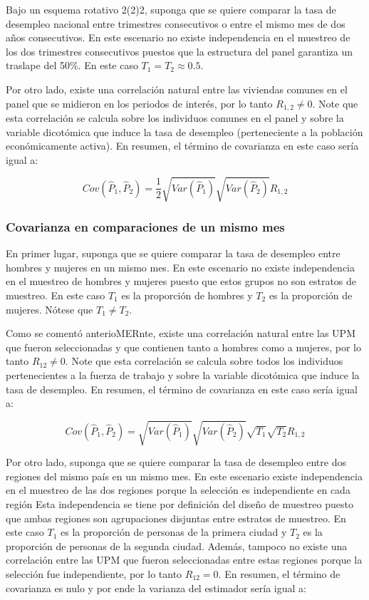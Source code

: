 \documentclass[
  12pt,
  spanish,
]{book}
\begin{document}
Bajo un esquema rotativo 2(2)2, suponga que se quiere comparar la tasa de desempleo nacional entre trimestres consecutivos o entre el mismo mes de dos años consecutivos. En este escenario no existe independencia en el muestreo de los dos trimestres consecutivos puestos que la estructura del panel garantiza un traslape del 50\%. En este caso \(T_1 = T_2 \approx 0.5\).

Por otro lado, existe una correlación natural entre las viviendas comunes en el panel que se midieron en los periodos de interés, por lo tanto \(R_{1,2} \neq 0\). Note que esta correlación se calcula sobre los individuos comunes en el panel y sobre la variable dicotómica que induce la tasa de desempleo (perteneciente a la población económicamente activa). En resumen, el término de covarianza en este caso sería igual a:

\[
Cov(\hat{P}_1, \hat{P}_2) = \frac{1}{2}\sqrt{Var(\hat{P}_1)}\sqrt{Var(\hat{P}_2)}R_{1,2}
\]

\hypertarget{covarianza-en-comparaciones-de-un-mismo-mes}{%
\subsubsection{Covarianza en comparaciones de un mismo mes}\label{covarianza-en-comparaciones-de-un-mismo-mes}}

En primer lugar, suponga que se quiere comparar la tasa de desempleo entre hombres y mujeres en un mismo mes. En este escenario no existe independencia en el muestreo de hombres y mujeres puesto que estos grupos no son estratos de muestreo. En este caso \(T_1\) es la proporción de hombres y \(T_2\) es la proporción de mujeres. Nótese que \(T_1 \neq T_2\).

Como se comentó anterioMERnte, existe una correlación natural entre las UPM que fueron seleccionadas y que contienen tanto a hombres como a mujeres, por lo tanto \(R_{12} \neq 0\). Note que esta correlación se calcula sobre todos los individuos pertenecientes a la fuerza de trabajo y sobre la variable dicotómica que induce la tasa de desempleo. En resumen, el término de covarianza en este caso sería igual a:

\[
Cov(\hat{P}_1, \hat{P}_2) = \sqrt{Var(\hat{P}_1)}\sqrt{Var(\hat{P}_2)}\sqrt{T_1}\sqrt{T_2}R_{1,2}
\]

Por otro lado, suponga que se quiere comparar la tasa de desempleo entre dos regiones del mismo país en un mismo mes. En este escenario existe independencia en el muestreo de las dos regiones porque la selección es independiente en cada región Esta independencia se tiene por definición del diseño de muestreo puesto que ambas regiones son agrupaciones disjuntas entre estratos de muestreo. En este caso \(T_1\) es la proporción de personas de la primera ciudad y \(T_2\) es la proporción de personas de la segunda ciudad. Además, tampoco no existe una correlación entre las UPM que fueron seleccionadas entre estas regiones porque la selección fue independiente, por lo tanto \(R_{12} = 0\). En resumen, el término de covarianza es nulo y por ende la varianza del estimador sería igual a:
\end{document}
